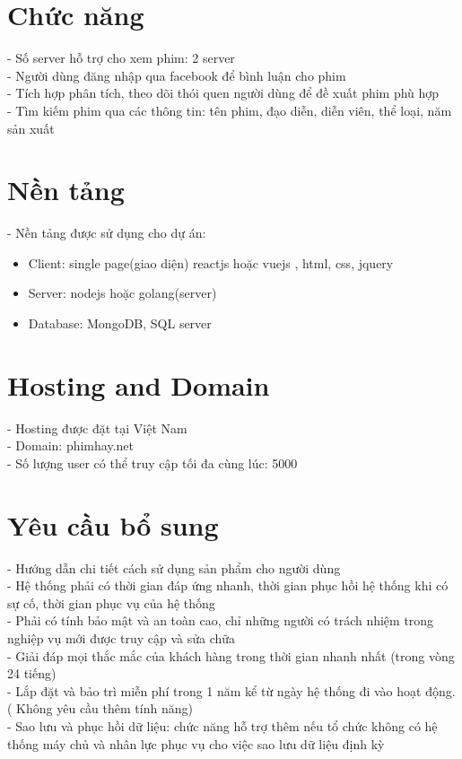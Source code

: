 \documentclass[a4paper]{book}
\begin{document}
\section{Chức năng}
- Số server hỗ trợ cho xem phim: 2 server\\
- Người dùng đăng nhập qua facebook để bình luận cho phim \\
- Tích hợp phân tích, theo dõi thói quen người dùng để đề xuất phim phù hợp \\
-  Tìm kiếm phim qua các thông tin: tên phim, đạo diễn, diễn viên, thể loại, năm sản xuất
\section{Nền tảng}
- Nền tảng được sử dụng cho dự án:
\begin{itemize}
	\item Client: single page(giao diện) reactjs hoặc vuejs , html, css, jquery
	\item Server: nodejs hoặc golang(server)
	\item Database: MongoDB, SQL server
\end{itemize}
\section{Hosting and Domain}
- Hosting được đặt tại Việt Nam\\
- Domain: phimhay.net\\
- Số lượng user có thể truy cập tối đa cùng lúc: 5000\\
\section{Yêu cầu bổ sung}
- Hướng dẫn chi tiết cách sử dụng sản phẩm cho người dùng\\
- Hệ thống phải có thời gian đáp ứng nhanh, thời gian phục hồi hệ thống khi có sự cố, thời gian phục vụ của hệ thống\\
- Phải có tính bảo mật và an toàn cao, chỉ những người có trách nhiệm trong nghiệp vụ mới được truy cập và sửa chữa\\
- Giải đáp mọi thắc mắc của khách hàng trong thời gian nhanh nhất (trong vòng 24 tiếng)\\
- Lắp đặt và bảo trì miễn phí trong 1 năm kể từ ngày hệ thống đi vào hoạt động.( Không yêu cầu thêm tính năng)\\
- Sao lưu và phục hồi dữ liệu: chức năng hỗ trợ thêm nếu tổ chức không có hệ thống máy chủ và nhân lực phục vụ cho việc sao lưu dữ liệu định kỳ
\end{document}

